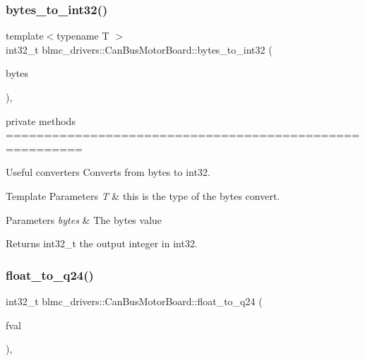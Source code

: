 \subsubsection{\texorpdfstring{bytes\+\_\+to\+\_\+int32()}{bytes\_to\_int32()}}
{\footnotesize\ttfamily template$<$typename T $>$ \\
int32\+\_\+t blmc\+\_\+drivers\+::\+Can\+Bus\+Motor\+Board\+::bytes\+\_\+to\+\_\+int32 (\begin{DoxyParamCaption}\item[{T}]{bytes }\end{DoxyParamCaption})\hspace{0.3cm}{\ttfamily [inline]}, {\ttfamily [private]}}



private methods ======================================================== 

Useful converters Converts from bytes to int32.


\begin{DoxyTemplParams}{Template Parameters}
{\em T} & this is the type of the bytes convert. \\
\hline
\end{DoxyTemplParams}

\begin{DoxyParams}{Parameters}
{\em bytes} & The bytes value \\
\hline
\end{DoxyParams}
\begin{DoxyReturn}{Returns}
int32\+\_\+t the output integer in int32. 
\end{DoxyReturn}
\mbox{\label{classblmc__drivers_1_1CanBusMotorBoard_ad6d91ccf867e9a3996492cce33270426}} 
\subsubsection{\texorpdfstring{float\+\_\+to\+\_\+q24()}{float\_to\_q24()}}
{\footnotesize\ttfamily int32\+\_\+t blmc\+\_\+drivers\+::\+Can\+Bus\+Motor\+Board\+::float\+\_\+to\+\_\+q24 (\begin{DoxyParamCaption}\item[{float}]{fval }\end{DoxyParamCaption})\hspace{0.3cm}{\ttfamily [inline]}, {\ttfamily [private]}}



